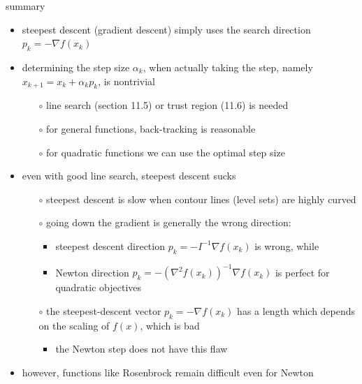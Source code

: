 \documentclass[10pt,hyperref]{beamer}
\newcommand{\grad}{\nabla}
\begin{document}
\begin{frame}{summary}

\begin{itemize}
\item steepest descent (gradient descent) simply uses the search direction $p_k = -\grad f(x_k)$
\item determining the step size $\alpha_k$, when actually taking the step, namely $x_{k+1}=x_k + \alpha_k p_k$, is nontrivial
    \begin{itemize}
    \item[$\circ$] line search (section 11.5) or trust region (11.6) is needed
    \item[$\circ$] for general functions, back-tracking is reasonable
    \item[$\circ$] for quadratic functions we can use the optimal step size
    \end{itemize}
\item even with good line search, steepest descent sucks
    \begin{itemize}
    \item[$\circ$] steepest descent is slow when contour lines (level sets) are highly curved

    \smallskip
    \item[$\circ$] going down the gradient is generally \alert{the wrong direction}:
        \begin{itemize}
        \item steepest descent direction $p_k = - I^{-1} \grad f(x_k)$ is wrong, while
        \item Newton direction $p_k = - (\grad^2f(x_k))^{-1} \grad f(x_k)$ is perfect for quadratic objectives
        \end{itemize}
    \item[$\circ$] the steepest-descent vector $p_k = -\grad f(x_k)$ has a length which depends on the scaling of $f(x)$, which is bad
        \begin{itemize}
        \item the Newton step does not have this flaw
        \end{itemize}
    \end{itemize}
\item however, functions like Rosenbrock remain difficult even for Newton
\end{itemize}
\end{frame}
\end{document}
